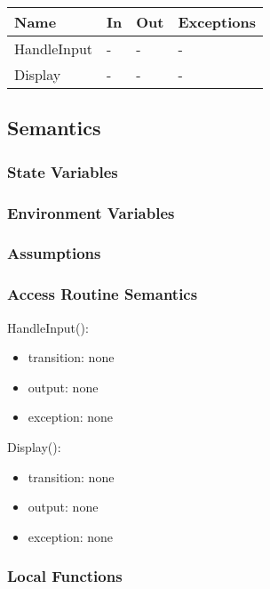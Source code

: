 \documentclass[12pt, titlepage]{article}
\begin{document}
\begin{center}
\begin{tabular}{p{2cm} p{4cm} p{4cm} p{2cm}}
\hline
\textbf{Name} & \textbf{In} & \textbf{Out} & \textbf{Exceptions} \\
\hline
HandleInput & - & - & - \\
Display & - & - & - \\

\hline
\end{tabular}
\end{center}

\subsection{Semantics}

\subsubsection{State Variables}

\subsubsection{Environment Variables}

\subsubsection{Assumptions}

\subsubsection{Access Routine Semantics}

\noindent HandleInput():
\begin{itemize}
\item transition: none
\item output: none
\item exception: none
\end{itemize}

\noindent Display():
\begin{itemize}
\item transition: none
\item output: none
\item exception: none
\end{itemize}

\subsubsection{Local Functions}
\end{document}
